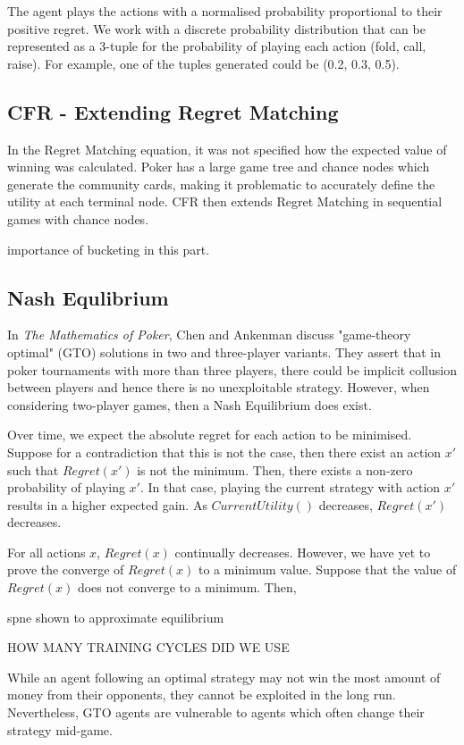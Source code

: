 \documentclass{article}
\begin{document}
The agent plays the actions with a normalised probability proportional to their positive regret. We work with a discrete probability distribution that can be represented as a 3-tuple for the probability of playing each action (fold, call, raise). For example, one of the tuples generated could be (0.2, 0.3, 0.5).

\subsection{CFR - Extending Regret Matching}

In the Regret Matching equation, it was not specified how the expected value of winning was calculated. Poker has a large game tree and chance nodes which generate the community cards, making it problematic to accurately define the utility at each terminal node. CFR then extends Regret Matching in sequential games with chance nodes.

importance of bucketing in this part.

\subsection{Nash Equlibrium}

In \textit{The Mathematics of Poker}, Chen and Ankenman discuss "game-theory optimal" (GTO) solutions in two and three-player variants. They assert that in poker tournaments with more than three players, there could be implicit collusion between players and hence there is no unexploitable strategy. However, when considering two-player games, then a Nash Equilibrium does exist. 

Over time, we expect the absolute regret for each action to be minimised. Suppose for a contradiction that this is not the case, then there exist an action $x'$ such that $Regret(x')$ is not the minimum. Then, there exists a non-zero probability of playing $x'$. In that case, playing the current strategy with action $x'$ results in a higher expected gain. As $CurrentUtility()$ decreases, $Regret(x')$ decreases.

For all actions $x$, $Regret(x)$ continually decreases. However, we have yet to prove the converge of $Regret(x)$ to a minimum value. Suppose that the value of $Regret(x)$ does not converge to a minimum. Then, 

spne shown to approximate equilibrium

HOW MANY TRAINING CYCLES DID WE USE

While an agent following an optimal strategy may not win the most amount of money from their opponents, they cannot be exploited in the long run. Nevertheless, GTO agents are vulnerable to agents which often change their strategy mid-game.
\end{document}
